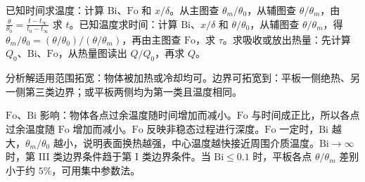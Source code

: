 已知时间求温度：计算 $\mathrm{Bi}$、$\mathrm{Fo}$ 和 $x/\delta$。从主图查 $\theta_m/\theta_0$，从辅图查 $\theta/\theta_m$，由 $\frac{\theta}{\theta_0}=\frac{t-t_\infty}{t_0-t_\infty}$ 求 $t$。已知温度求时间：计算 $\mathrm{Bi}$、$x/\delta$ 和 $\theta/\theta_0$，从辅图查 $\theta/\theta_m$，得 $\theta_m/\theta_0=(\theta/\theta_0)/(\theta/\theta_m)$，再由主图查 $\mathrm{Fo}$，求 $\tau$。求吸收或放出热量：先计算 $Q_0$、$\mathrm{Bi}$、$\mathrm{Fo}$，从热量图读出 $Q/Q_0$，再求 $Q$。

分析解适用范围拓宽：物体被加热或冷却均可。边界可拓宽到：平板一侧绝热、另一侧第三类边界；或平板两侧均为第一类且温度相同。

$\mathrm{Fo}$、$\mathrm{Bi}$ 影响：物体各点过余温度随时间增加而减小。$\mathrm{Fo}$ 与时间成正比，所以各点过余温度随 $\mathrm{Fo}$ 增加而减小。$\mathrm{Fo}$ 反映非稳态过程进行深度。$\mathrm{Fo}$ 一定时，$\mathrm{Bi}$ 越大，$\theta_m/\theta_0$ 越小，说明表面换热越强，中心温度越快接近周围介质温度。$\mathrm{Bi}\to\infty$ 时，第 III 类边界条件趋于第 I 类边界条件。当 $\mathrm{Bi}\le 0.1$ 时，平板各点 $\theta/\theta_m$ 差别小于约 $5\%$，可用集中参数法。

\divider